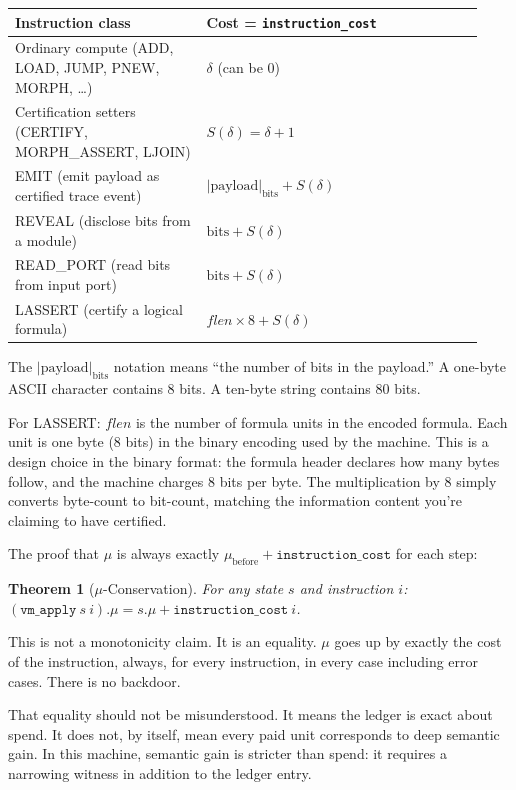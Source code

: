 \documentclass[11pt,a4paper]{article}
\theoremstyle{plain}
\newtheorem{theorem}{Theorem}[section]
\theoremstyle{definition}
\theoremstyle{remark}
\begin{document}
\medskip
\begin{center}
\begin{tabular}{@{}p{0.38\linewidth}p{0.55\linewidth}@{}}
\toprule
Instruction class & Cost = \texttt{instruction\_cost} \\
\midrule
Ordinary compute (ADD, LOAD, JUMP, PNEW, MORPH, \ldots) & $\delta$ \quad (can be 0) \\
Certification setters (CERTIFY, MORPH\_ASSERT, LJOIN) & $S(\delta) = \delta + 1$ \\
EMIT (emit payload as certified trace event) & $|\text{payload}|_{\mathrm{bits}} + S(\delta)$ \\
REVEAL (disclose bits from a module) & $\text{bits} + S(\delta)$ \\
READ\_PORT (read bits from input port) & $\text{bits} + S(\delta)$ \\
LASSERT (certify a logical formula) & $\mathit{flen} \times 8 + S(\delta)$ \\
\bottomrule
\end{tabular}
\end{center}
\medskip

The $|\text{payload}|_{\mathrm{bits}}$ notation means ``the number of bits in the payload.'' A one-byte ASCII character contains 8 bits. A ten-byte string contains 80 bits.

For LASSERT: $\mathit{flen}$ is the number of formula units in the encoded formula. Each unit is one byte (8 bits) in the binary encoding used by the machine. This is a design choice in the binary format: the formula header declares how many bytes follow, and the machine charges 8 bits per byte. The multiplication by 8 simply converts byte-count to bit-count, matching the information content you're claiming to have certified.

The proof that $\mu$ is always exactly $\mu_{\text{before}} + \texttt{instruction\_cost}$ for each step:

\begin{theorem}[$\mu$-Conservation]
For any state $s$ and instruction $i$: $(\texttt{vm\_apply}\ s\ i).\mu = s.\mu + \texttt{instruction\_cost}\ i$.
\end{theorem}

This is not a monotonicity claim. It is an equality. $\mu$ goes up by exactly the cost of the instruction, always, for every instruction, in every case including error cases. There is no backdoor.

That equality should not be misunderstood. It means the ledger is exact about spend. It does not, by itself, mean every paid unit corresponds to deep semantic gain. In this machine, semantic gain is stricter than spend: it requires a narrowing witness in addition to the ledger entry.
\end{document}
